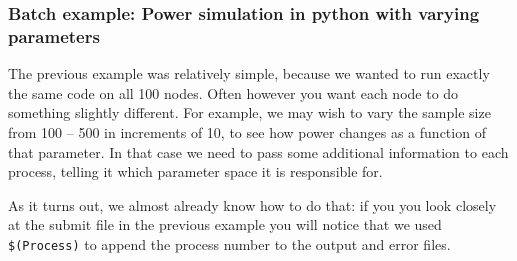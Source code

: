 \documentclass[11pt]{article}
\begin{document}
\subsubsection{Batch example: Power simulation in python with varying parameters}
\label{sec:org881926c}
The previous example was relatively simple, because we wanted to run exactly the same code on all 100 nodes. Often however you want each node to do something slightly different. For example, we may wish to vary the sample size from 100 -- 500 in increments of 10, to see how power changes as a function of that parameter. In that case we need to pass some additional information to each process, telling it which parameter space it is responsible for. 

As it turns out, we almost already know how to do that: if you you look closely at the submit file in the previous example you will notice that we used \texttt{\$(Process)} to append the process number to the output and error files. 
\end{document}
